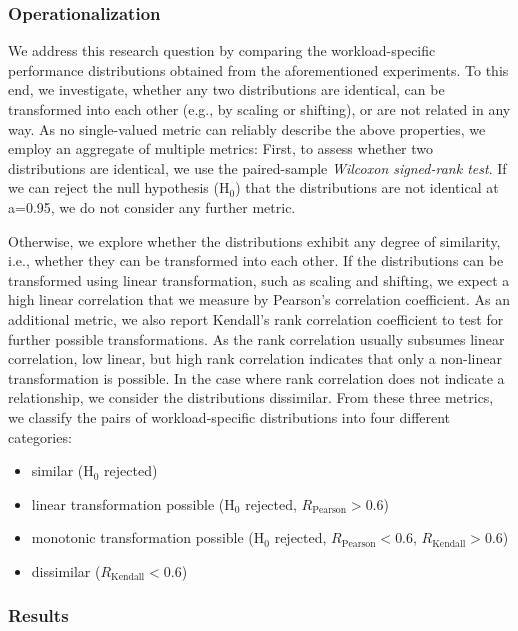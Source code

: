 
\subsubsection{Operationalization}
We address this research question by comparing the workload-specific performance distributions obtained from the aforementioned experiments. To this end, we investigate, whether any two distributions are identical, can be transformed into each other (e.g., by scaling or shifting), or are not related in any way. As no single-valued metric can reliably describe the above properties, we employ an aggregate of multiple metrics: First, to assess whether two distributions are identical, we use the paired-sample \emph{Wilcoxon signed-rank test}. If we can reject the null hypothesis ($\text{H}_0$) that the distributions are not identical at a=0.95, we do not consider any further metric. 

Otherwise, we explore whether the distributions exhibit any degree of similarity, i.e., whether they can be transformed into each other. If the distributions can be transformed using linear transformation, such as scaling and shifting, we expect a high linear correlation that we measure by Pearson’s correlation coefficient. As an additional metric, we also report Kendall’s rank correlation coefficient to test for further possible transformations. As the rank correlation usually subsumes linear correlation, low linear, but high rank correlation indicates that only a non-linear transformation is possible. In the case where rank correlation does not indicate a relationship, we consider the distributions dissimilar. From these three metrics, we classify the pairs of workload-specific distributions into four different categories:

\begin{itemize}
	\item similar ($\text{H}_0$ rejected)
	\item linear transformation possible ($\text{H}_0$ rejected, $R_\text{Pearson} > 0.6$)
	\item monotonic transformation possible ($\text{H}_0$ rejected, $R_\text{Pearson} < 0.6$, $R_\text{Kendall} > 0.6$)
	\item dissimilar ($R_\text{Kendall} < 0.6$)
\end{itemize}

\subsubsection{Results}

